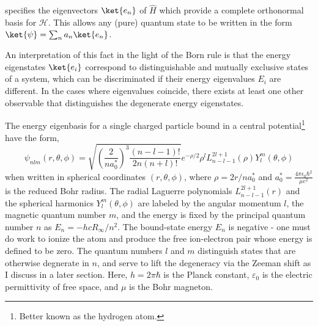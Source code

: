 	specifies the eigenvectors $\ket{e_n}$ of $\hat{H}$ which provide a complete orthonormal basis for $\mathcal{H}$.
	This allows any (pure) quantum state to be written in the form $\ket{\psi} = \sum_n a_n\ket{e_n}$.
	
	An interpretation of this fact in the light of the Born rule is that the energy eigenstates $\ket{e_i}$ correspond to distinguishable  and mutually exclusive  states of a system, which can be discriminated if their energy eigenvalues $E_i$ are different.
	In the cases where eigenvalues coincide, there exists at least one other observable that distinguishes the degenerate energy eigenstates.

	
	
	The energy eigenbasis for a single charged particle bound in a central potential\footnote{Better known as the hydrogen atom.} have the form,
	\begin{equation}
	\psi_{nlm}(r,\theta,\phi) = 
	\sqrt{\left(\frac{2}{na_0 ^*}\right)^3\frac{(n-l-1)!}{2n(n+l)!}}e^{-\rho/2}\rho^l L_{n-l-1}^{2l+1}(\rho) Y^{m}_{l}(\theta,\phi)
	\end{equation}
	when written in spherical coordinates $(r,\theta,\phi)$, where $\rho = 2r/na_0 ^*$ and $a_0 ^* = \frac{4\pi\epsilon_0 \hbar^2}{\mu e^2}$ is the reduced Bohr radius.
	The radial Laguerre polynomials $L_{n-l-1}^{2l+1}(r)$ and the spherical harmonics $Y_{l}^{m}(\theta,\phi)$ are labeled by the angular momentum $l$, the magnetic quantum number $m$, and the energy is fixed by the principal quantum number $n$ as $E_n = -hcR_\infty/n^2$.
	The bound-state energy $E_n$ is negative - one must do work to ionize the atom and produce the free ion-electron pair whose energy is defined to be zero.
	The quantum numbers $l$ and $m$ distinguish states that are otherwise degnerate in $n$, and serve to lift the degeneracy via the Zeeman shift as I discuss in a later section.
	Here,  $h=2\pi\hbar$ is the Planck constant, $\varepsilon_0$ is the electric permittivity of free space, and $\mu$ is the Bohr magneton.
	
	

